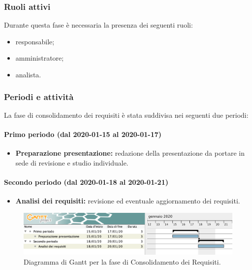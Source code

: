 			\subsubsection{Ruoli attivi}
			
				Durante questa fase è necessaria la presenza dei seguenti ruoli:
				\begin{itemize}
					\item responsabile;
					\item amministratore;
					\item analista.
				\end{itemize}
			
			\subsubsection{Periodi e attività}
			
				La fase di consolidamento dei requisiti è stata suddivisa nei seguenti due periodi:
				
				\paragraph{Primo periodo (dal 2020-01-15 al 2020-01-17)}
				
					\begin{itemize}
						\item \textbf{Preparazione presentazione:} redazione della presentazione da portare in sede di revisione e studio individuale.
					\end{itemize}
				
				\paragraph{Secondo periodo (dal 2020-01-18 al 2020-01-21)}
				
					\begin{itemize}
						\item \textbf{Analisi dei requisiti:} revisione ed eventuale aggiornamento dei requisiti.
					\end{itemize}

		\begin{landscape}

          \begin{figure}[H]
            \centering
            \includegraphics[width=\linewidth]{images/ganttConsolidamento}
            \caption{Diagramma di Gantt per la fase di Consolidamento dei Requisiti.}
          \end{figure}		

		\end{landscape}

